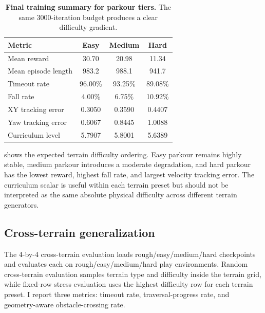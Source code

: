 \documentclass{article}
\begin{document}
\begin{table}[t]
    \caption{\textbf{Final training summary for parkour tiers.} The same 3000-iteration budget produces a clear difficulty gradient.}
    \label{tab:parkour-training}
    \centering
    \begin{tabular}{lccc}
        \toprule
        Metric & Easy & Medium & Hard \\
        \midrule
        Mean reward & 30.70 & 20.98 & 11.34 \\
        Mean episode length & 983.2 & 988.1 & 941.7 \\
        Timeout rate & 96.00\% & 93.25\% & 89.08\% \\
        Fall rate & 4.00\% & 6.75\% & 10.92\% \\
        XY tracking error & 0.3050 & 0.3590 & 0.4407 \\
        Yaw tracking error & 0.6067 & 0.8445 & 1.0088 \\
        Curriculum level & 5.7907 & 5.8001 & 5.6389 \\
        \bottomrule
    \end{tabular}
\end{table}

 shows the expected terrain difficulty ordering. Easy parkour remains highly stable, medium parkour introduces a moderate degradation, and hard parkour has the lowest reward, highest fall rate, and largest velocity tracking error. The curriculum scalar is useful within each terrain preset but should not be interpreted as the same absolute physical difficulty across different terrain generators.


\subsection{Cross-terrain generalization}

The 4-by-4 cross-terrain evaluation loads rough/easy/medium/hard checkpoints and evaluates each on rough/easy/medium/hard play environments. Random cross-terrain evaluation samples terrain type and difficulty inside the terrain grid, while fixed-row stress evaluation uses the highest difficulty row for each terrain preset. I report three metrics: timeout rate, traversal-progress rate, and geometry-aware obstacle-crossing rate.
\end{document}
